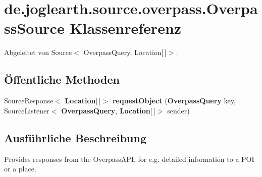 \section{de.\-joglearth.\-source.\-overpass.\-Overpass\-Source Klassenreferenz}
\label{classde_1_1joglearth_1_1source_1_1overpass_1_1_overpass_source}


Abgeleitet von Source$<$ Overpass\-Query, Location[$\,$]$>$.

\subsection*{Öffentliche Methoden}
\begin{DoxyCompactItemize}
\item 
Source\-Response$<$ {\bf Location}[$\,$]$>$ {\bfseries request\-Object} ({\bf Overpass\-Query} key, Source\-Listener$<$ {\bf Overpass\-Query}, {\bf Location}[$\,$]$>$ sender)\label{classde_1_1joglearth_1_1source_1_1overpass_1_1_overpass_source_a95145695b397d6c3e87d06d7fbec9bfb}

\end{DoxyCompactItemize}


\subsection{Ausführliche Beschreibung}
Provides responses from the Overpass\-A\-P\-I, for e.\-g. detailed information to a P\-O\-I or a place. 